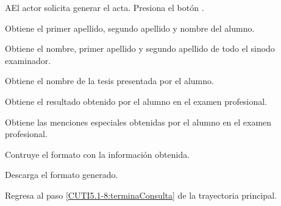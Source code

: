 \begin{UCtrayectoriaA}{A}{El actor solicita generar el acta.}
	\UCpaso[\UCactor] Presiona el botón .
	
	\UCpaso[\UCsist] Obtiene el primer apellido, segundo apellido y nombre del alumno.
	
	\UCpaso[\UCsist] Obtiene el nombre, primer apellido y segundo apellido de todo el sinodo examinador.

	\UCpaso[\UCsist] Obtiene el nombre de la tesis presentada por el alumno.
	
	\UCpaso[\UCsist] Obtiene el resultado obtenido por el alumno en el examen profesional.
	
	\UCpaso[\UCsist] Obtiene las menciones especiales obtenidas por el alumno en el examen profesional.
	
	\UCpaso[\UCsist] Contruye el formato  con la información obtenida.
	
	\UCpaso[\UCsist] Descarga el formato generado.
			
	\UCpaso[] Regresa al paso \ref{CUTI5.1-8:terminaConsulta} de la trayectoria principal.
	
\end{UCtrayectoriaA}
